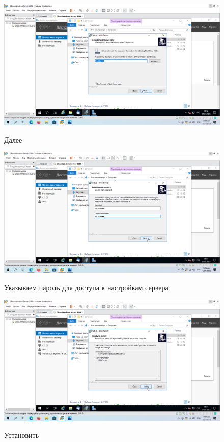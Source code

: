 \documentclass[a4paper]{article}
\begin{document}
  \begin{figure}[H]
    \centering
    \includegraphics[width=\textwidth]{11_0052}
    \label{img:52}
    \caption{Далее}
  \end{figure}

  \begin{figure}[H]
    \centering
    \includegraphics[width=\textwidth]{11_0053}
    \label{img:53}
    \caption{Указываем пароль для доступа к настройкам сервера}
  \end{figure}

  \begin{figure}[H]
    \centering
    \includegraphics[width=\textwidth]{11_0054}
    \label{img:54}
    \caption{Установить}
  \end{figure}
\end{document}
